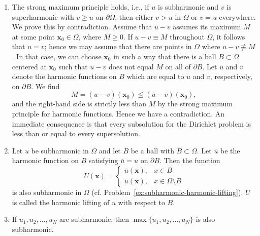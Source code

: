 \begin{enumerate}
\item The strong maximum principle holds, i.e., if $u$ is subharmonic and $v$ is superharmonic with $v\geq u$ on $\partial\Omega$, then either $v>u$ in $\Omega$ or $v=u$ everywhere. We prove this by contradiction. Assume that $u-v$ assumes its maximum $M$ at some point $\bm{x}_0\in\Omega$, where $M\geq0$. If $u-v\equiv M$ throughout $\Omega$, it follows that $u=v$; hence we may assume that there are points in $\Omega$ where $u-v\not\equiv M$. In that case, we can choose $\bm{x}_0$ in such a way that there is a ball $B\subset\Omega$ centered at $\bm{x}_0$ such that $u-v$ does not equal $M$ on all of $\partial B$. Let $\bar u$ and $\bar v$ denote the harmonic functions on $B$ which are equal to $u$ and $v$, respectively, on $\partial B$. We find
\begin{equation}\label{eq:subharmonic-difference-at-maximum}
M=(u-v)(\bm{x}_0)\leq(\bar u-\bar v)(\bm{x}_0),
\end{equation}
and the right-hand side is strictly less than $M$ by the strong maximum principle for harmonic functions. Hence we have a contradiction. An immediate consequence is that every subsolution for the Dirichlet problem is less than or equal to every supersolution.\item Let $u$ be subharmonic in $\Omega$ and let $B$ be a ball with $\overline B\subset\Omega$. Let $\bar u$ be the harmonic function on $B$ satisfying $\bar u=u$ on $\partial B$. Then the function
\begin{equation}\label{eq:subharmonic-harmonic-lifting}
U(\bm{x})=\begin{cases}\bar u(\bm{x}),&x\in B\\u(\bm{x}),&x\in\Omega\setminus B\end{cases}
\end{equation}
is also subharmonic in $\Omega$ (cf. Problem~\ref{ex:subharmonic-harmonic-lifting}). $U$ is called the harmonic lifting of $u$ with respect to $B$.\item If $u_1,u_2,\ldots,u_N$ are subharmonic, then $\max\{u_1,u_2,\ldots,u_N\}$ is also subharmonic.\end{enumerate}
